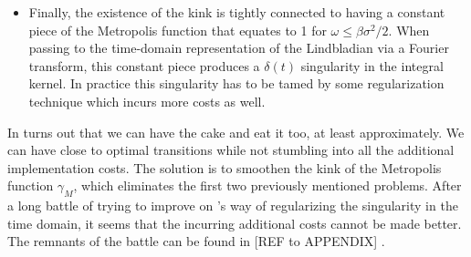 \begin{itemize}
    \item Finally, the existence of the kink is tightly connected to having a constant piece of the Metropolis function that equates to 1 for $\omega \leq \beta\sigma^2 / 2$. When passing to the time-domain representation of the Lindbladian via a Fourier transform, this constant piece produces a $\delta(t)$ singularity in the integral kernel. In practice this singularity has to be tamed by some regularization technique which incurs more costs as well.
\end{itemize}

In turns out that we can have the cake and eat it too, at least approximately. We can have close to optimal transitions while not stumbling into all the additional implementation costs. The solution is to smoothen the kink of the Metropolis function $\gamma_M$, which eliminates the first two previously mentioned problems. After a long battle of trying to improve on \cite{chen2023quantum}'s way of regularizing the singularity in the time domain, it seems that the incurring additional costs cannot be made better. The remnants of the battle can be found in [REF to APPENDIX] .

